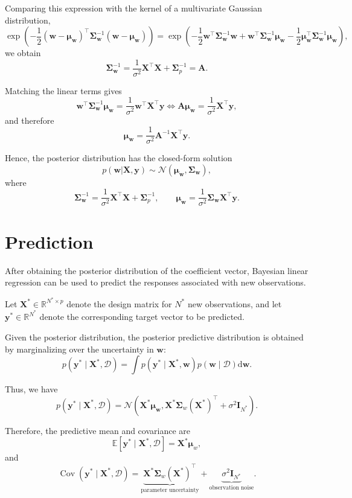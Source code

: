 \documentclass[../Bayesian_Inference.tex]{subfiles}
\begin{document}
Comparing this expression with the kernel of a multivariate Gaussian distribution,
\[
    \exp\left(-\frac{1}{2} (\bm{w} - \bm{\mu}_{\bm{w}})^{\top} \mathbf{\Sigma}_{\bm{w}}^{-1} (\bm{w} - \bm{\mu}_{\bm{w}}) \right) = 
    \exp\left( -\frac{1}{2} \bm{w}^{\top} \mathbf{\Sigma}_{\bm{w}}^{-1} \bm{w} + \bm{w}^{\top} \mathbf{\Sigma}_{\bm{w}}^{-1} \bm{\mu}_{\bm{w}} - \frac{1}{2} \bm{\mu}_{\bm{w}}^{\top} \mathbf{\Sigma}_{\bm{w}}^{-1} \bm{\mu}_{\bm{w}} \right),
\]
we obtain
\[
    \mathbf{\Sigma}_{\bm{w}}^{-1} = \frac{1}{\sigma^{2}} \mathbf{X}^{\top} \mathbf{X} + \mathbf{\Sigma}_{p}^{-1} = \mathbf{A}.
\]

Matching the linear terms gives
\[
    \bm{w}^{\top} \mathbf{\Sigma}_{\bm{w}}^{-1} \bm{\mu}_{\bm{w}} = \frac{1}{\sigma^{2}} \bm{w}^{\top} \mathbf{X}^{\top} \bm{y} \Leftrightarrow \mathbf{A} \bm{\mu}_{\bm{w}} = \frac{1}{\sigma^{2}} \mathbf{X}^{\top} \bm{y},
\]
and therefore
\[
    \bm{\mu}_{\bm{w}} = \frac{1}{\sigma^{2}} \mathbf{A}^{-1} \mathbf{X}^{\top} \bm{y}.
\]

Hence, the posterior distribution has the closed-form solution
\[
    p(\bm{w} | \mathbf{X}, \bm{y}) \sim \mathcal{N}(\bm{\mu}_{\bm{w}}, \mathbf{\Sigma}_{\bm{w}}),
\]
where 
\[
    \mathbf{\Sigma}_{\bm{w}}^{-1} = \frac{1}{\sigma^{2}} \mathbf{X}^{\top} \mathbf{X} + \mathbf{\Sigma}_{p}^{-1}, \qquad \bm{\mu}_{\bm{w}} = \frac{1}{\sigma^{2}} \mathbf{\Sigma}_{\bm{w}} \mathbf{X}^{\top} \bm{y}.
\]


\section{Prediction}

After obtaining the posterior distribution of the coefficient vector, Bayesian linear regression can be used to predict the responses associated with new observations.

Let $\mathbf{X}^{*}\in\mathbb{R}^{N^{*}\times p}$ denote the design matrix for $N^{*}$ new observations, and let $\bm{y}^{*}\in\mathbb{R}^{N^{*}}$ denote the corresponding target vector to be predicted.

Given the posterior distribution, the posterior predictive distribution is obtained by marginalizing over the uncertainty in $\bm{w}$:
\[
    p(\bm{y}^{*}\mid\mathbf{X}^{*},\mathcal{D}) = \int p(\bm{y}^{*}\mid\mathbf{X}^{*},\bm{w})p(\bm{w}\mid\mathcal{D})\mathrm{d}\bm{w}.
\]

Thus, we have 
\[
    p(\bm{y}^{*}\mid\mathbf{X}^{*},\mathcal{D}) = \mathcal{N}\left(\mathbf{X}^{*}\bm{\mu}_{\bm{w}}, \mathbf{X}^{*}\mathbf{\Sigma}_{w}(\mathbf{X}^{*})^{\top} + \sigma^{2}\mathbf{I}_{N^{*}} \right).
\]

Therefore, the predictive mean and covariance are
\[
    \mathbb{E}\left[\bm{y}^{*}\mid\mathbf{X}^{*},\mathcal{D}\right]=\mathbf{X}^{*}\bm{\mu}_{w},
\]
and
\[
    \operatorname{Cov}\left(\bm{y}^{*}\mid\mathbf{X}^{*},\mathcal{D}\right)=\underbrace{\mathbf{X}^{*}\mathbf{\Sigma}_{w}(\mathbf{X}^{*})^{\top}}_{\text{parameter uncertainty}} + \underbrace{\sigma^{2}\mathbf{I}_{N^{*}}}_{\text{observation noise}}.
\]
\end{document}
